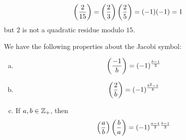 \begin{example}
    \[\left(\dfrac{2}{15}\right) = \left(\dfrac{2}{3}\right)\left(\dfrac{2}{5}\right) = (-1)(-1) = 1\]
    but $2$ is not a quadratic residue modulo $15$.
\end{example}
\begin{proposition}[5.2.2 of Text]\label{prop:5.2.2}
    We have the following properties about the Jacobi symbol:
    \begin{enumerate}[(a)]
        \item \[\left(\dfrac{-1}{b}\right) = (-1)^{\frac{b-1}{2}}\]
        \item \[\left(\dfrac{2}{b}\right) = (-1)^{\frac{b^2 - 1}{8}}\]
        \item If $a, b\in\mathbb Z_+$, then
              \[\left(\dfrac{a}{b}\right)\left(\dfrac{b}{a}\right) = (-1)^{\frac{a-1}{2}\frac{b-1}{2}}\]
    \end{enumerate}
\end{proposition}